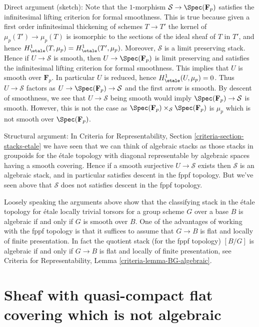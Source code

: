\medskip\noindent
Direct argument (sketch): Note that the $1$-morphism
$\mathcal{S} \to \Spec(\mathbf{F}_p)$ satisfies the
infinitesimal lifting criterion for formal smoothness.
This is true because given a first order infinitesimal thickening
of schemes $T \to T'$ the kernel of $\mu_p(T') \to \mu_p(T)$
is isomorphic to the sections of the ideal sheaf of $T$ in $T'$, and
hence $H^1_\etale(T, \mu_p) = H^1_\etale(T', \mu_p)$.
Moreover, $\mathcal{S}$ is a limit preserving stack. Hence
if $U \to \mathcal{S}$ is smooth, then $U \to \Spec(\mathbf{F}_p)$
is limit preserving and satisfies  the
infinitesimal lifting criterion for formal smoothness.
This implies that $U$ is smooth over $\mathbf{F}_p$.
In particular $U$ is reduced, hence $H^1_\etale(U, \mu_p) = 0$.
Thus $U \to \mathcal{S}$ factors as
$U \to \Spec(\mathbf{F}_p) \to \mathcal{S}$
and the first arrow is smooth. By descent of smoothness, we see
that $U \to \mathcal{S}$ being smooth would imply
$\Spec(\mathbf{F}_p) \to \mathcal{S}$ is smooth. However, this
is not the case as
$\Spec(\mathbf{F}_p) \times_\mathcal{S} \Spec(\mathbf{F}_p)$
is $\mu_p$ which is not smooth over $\Spec(\mathbf{F}_p)$.


\medskip\noindent
Structural argument: In
Criteria for Representability, Section \ref{criteria-section-stacks-etale}
we have seen that we can think of algebraic stacks as those
stacks in groupoids for the \'etale topology with diagonal
representable by algebraic spaces having a smooth covering.
Hence if a smooth surjective $U \to \mathcal{S}$ exists then
$\mathcal{S}$ is an algebraic stack, and in particular satisfies
descent in the fppf topology. But we've seen above that $\mathcal{S}$
does not satisfies descent in the fppf topology.

\medskip\noindent
Loosely speaking the arguments above show that the classifying
stack in the \'etale topology for \'etale locally trivial torsors
for a group scheme $G$ over a base $B$ is algebraic if and only
if $G$ is smooth over $B$. One of the advantages of working with
the fppf topology is that it suffices to assume that $G \to B$
is flat and locally of finite presentation. In fact the quotient
stack (for the fppf topology) $[B/G]$ is algebraic if and only
if $G \to B$ is flat and locally of finite presentation, see
Criteria for Representability, Lemma \ref{criteria-lemma-BG-algebraic}.







\section{Sheaf with quasi-compact flat covering which is not algebraic}
\label{section-not-algebraic}

